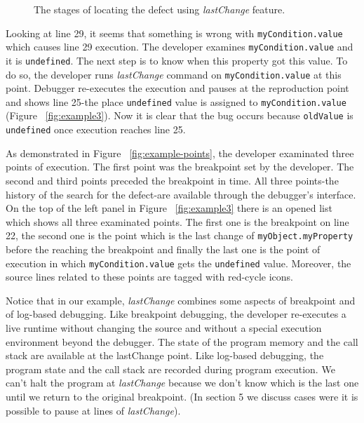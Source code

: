 \documentclass[preprint]{sigplanconf}
\begin{document}
\begin{figure}[htp]
\caption{The stages of locating the defect using \textit{lastChange} feature.}
\label{fig:lastChange}
\end{figure}

Looking at line 29, it seems that something is wrong with
\texttt{myCondition.value} which causes line 29 execution. The
developer examines \texttt{myCondition.value} and it is
\texttt{undefined}. The next step is to know when this property got
this value. To do so, the developer runs \textit{lastChange} command
on \texttt{myCondition.value} at this point. Debugger re-executes the
execution and pauses at the reproduction point and shows line 25-the
place \texttt{undefined} value is assigned to
\texttt{myCondition.value} (Figure ~\ref{fig:example3}). Now it is
clear that the bug occurs because \texttt{oldValue} is
\texttt{undefined} once execution reaches line 25.

As demonstrated in Figure ~\ref{fig:example-points}, the developer
examinated three points of execution. The first point was the breakpoint set by the developer.
The second and third points preceded the breakpoint in time.
All three points-the history
of the search for the defect-are available through the debugger's
interface. On the top of the left panel in Figure ~\ref{fig:example3}
there is an opened list which shows all three examinated points. The
first one is the breakpoint on line 22, the second one is the point
which is the last change of \texttt{myObject.myProperty} before the
reaching the breakpoint and finally the last one is the point of
execution in which \texttt{myCondition.value} gets the
\texttt{undefined} value. Moreover, the source lines related to these
points are tagged with red-cycle icons.

Notice that in our example, \textit{lastChange} combines some aspects
of breakpoint and of log-based debugging. Like breakpoint debugging,
the developer re-executes a live runtime without changing the source
and without a special execution environment beyond the debugger. The
state of the program memory and the call stack are available at the
lastChange point. Like log-based debugging, the program state and the
call stack are recorded during program execution. We can't halt the
program at \textit{lastChange} because we don't know which is the last
one until we return to the original breakpoint. (In section 5 we
discuss cases were it is possible to pause at lines of \textit{lastChange}).

\end{document}
